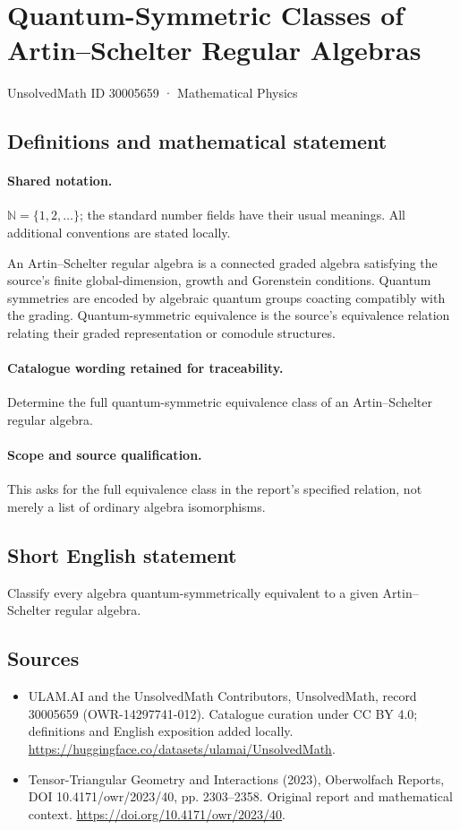\documentclass[11pt]{article}
\begin{document}
\setcounter{section}{30005658}
\section{Quantum-Symmetric Classes of Artin–Schelter Regular Algebras}\label{30005659}
{\small UnsolvedMath ID 30005659 · Mathematical Physics}
\subsection{Definitions and mathematical statement}

\paragraph{Shared notation.}$\mathbb N=\{1,2,\ldots\}$; the standard number fields have their usual meanings. All additional conventions are stated locally.


An Artin--Schelter regular algebra is a connected graded algebra satisfying the source's finite global-dimension, growth and Gorenstein conditions. Quantum symmetries are encoded by algebraic quantum groups coacting compatibly with the grading. Quantum-symmetric equivalence is the source's equivalence relation relating their graded representation or comodule structures.

\paragraph{Catalogue wording retained for traceability.}
Determine the full quantum-symmetric equivalence class of an Artin–Schelter regular algebra.

\paragraph{Scope and source qualification.}This asks for the full equivalence class in the report's specified relation, not merely a list of ordinary algebra isomorphisms.
\subsection{Short English statement}
Classify every algebra quantum-symmetrically equivalent to a given Artin--Schelter regular algebra.
\subsection{Sources}
\begin{itemize}
\item[\hypertarget{source:30005659:1}{S1}] ULAM.AI and the UnsolvedMath Contributors, UnsolvedMath, record 30005659 (OWR-14297741-012). Catalogue curation under CC BY 4.0; definitions and English exposition added locally.
\url{https://huggingface.co/datasets/ulamai/UnsolvedMath}.
\item[\hypertarget{source:30005659:2}{S2}] Tensor-Triangular Geometry and Interactions (2023), Oberwolfach Reports, DOI 10.4171/owr/2023/40, pp. 2303--2358. Original report and mathematical context.
\url{https://doi.org/10.4171/owr/2023/40}.
\end{itemize}
\label{end:30005659}
\end{document}
